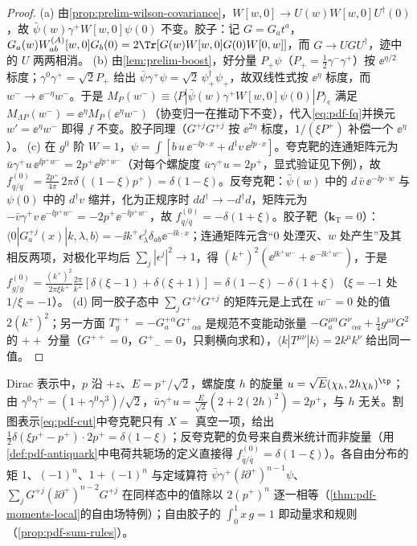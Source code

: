 \begin{proof}
(a) 由\cref{prop:prelim-wilson-covariance}，$W[w,0]\to U(w)W[w,0]U^\dagger(0)$，故 $\bar\psi(w)\gamma^+W[w,0]\psi(0)$ 不变。胶子：记 $G=G_at^a$，$G_a(w)W^{(A)}_{ab}[w,0]G_b(0)=2\Tr[G(w)W[w,0]G(0)W[0,w]]$，而 $G\to UGU^\dagger$，迹中的 $U$ 两两相消。
(b) 由\cref{lem:prelim-boost}，好分量 $P_+\psi$（$P_+=\frac12\gamma^-\gamma^+$）按 $\ee^{\eta/2}$ 标度；$\gamma^0\gamma^+=\sqrt2P_+$ 给出 $\bar\psi\gamma^+\psi=\sqrt2\,\psi_+^\dagger\psi_+$，故双线性式按 $\ee^{\eta}$ 标度，而 $w^-\to\ee^{-\eta}w^-$。于是 $M_P(w^-)\equiv\langle P|\bar\psi(w)\gamma^+W[w,0]\psi(0)|P\rangle_{\mathrm c}$ 满足 $M_{\Lambda P}(w^-)=\ee^{\eta}M_P(\ee^{\eta}w^-)$（协变归一在推动下不变），代入\cref{eq:pdf-fq}并换元 $w'=\ee^\eta w^-$ 即得 $f$ 不变。胶子同理（$G^{+j}G^{+j}$ 按 $\ee^{2\eta}$ 标度，$1/(\xi P^+)$ 补偿一个 $\ee^{\eta}$）。
(c) 在 $g^0$ 阶 $W=1$，$\psi=\int[b\,u\,\ee^{-\ii p\cdot x}+d^\dagger v\,\ee^{\ii p\cdot x}]$。夸克靶的连通矩阵元为 $\bar u\gamma^+u\,\ee^{\ii p^+w^-}=2p^+\ee^{\ii p^+w^-}$（对每个螺旋度 $\bar u\gamma^+u=2p^+$，显式验证见下例），故 $f^{(0)}_{q/q}=\frac{2p^+}{4\pi}\,2\pi\delta((1-\xi)p^+)=\delta(1-\xi)$。反夸克靶：$\bar\psi(w)$ 中的 $d\,\bar v\,\ee^{-\ii p\cdot w}$ 与 $\psi(0)$ 中的 $d^\dagger v$ 缩并，化为正规序时 $dd^\dagger\to-d^\dagger d$，矩阵元为 $-\bar v\gamma^+v\,\ee^{-\ii p^+w^-}=-2p^+\ee^{-\ii p^+w^-}$，故 $f^{(0)}_{q/\bar q}=-\delta(1+\xi)$。胶子靶（$\bm k_{\mathrm T}=0$）：$\langle0|G^{+j}_a(x)|k,\lambda,b\rangle=-\ii k^+\epsilon^j_\lambda\delta_{ab}\ee^{-\ii k\cdot x}$；连通矩阵元含“$0$ 处湮灭、$w$ 处产生”及其相反两项，对极化平均后 $\sum_j|\epsilon^j|^2\to1$，得 $(k^+)^2(\ee^{\ii k^+w^-}+\ee^{-\ii k^+w^-})$，于是 $f^{(0)}_{g/g}=\frac{(k^+)^2}{2\pi\xi k^+}\frac{2\pi}{k^+}[\delta(\xi-1)+\delta(\xi+1)]=\delta(1-\xi)-\delta(1+\xi)$（$\xi=-1$ 处 $1/\xi=-1$）。
(d) 同一胶子态中 $\sum_jG^{+j}G^{+j}$ 的矩阵元是上式在 $w^-=0$ 处的值 $2(k^+)^2$；另一方面 $T^{++}_g=-G^{+\alpha}_aG^{+}{}_{\alpha a}$ 是规范不变能动张量 $-G^{\mu\alpha}_aG^\nu{}_{\alpha a}+\frac14g^{\mu\nu}G^2$ 的 $++$ 分量（$G^{++}=0$，$G^+{}_-=0$，只剩横向求和），$\langle k|T^{\mu\nu}|k\rangle=2k^\mu k^\nu$ 给出同一值。
\end{proof}

\begin{example}[自由场值]\label{ex:pdf-free-field}
Dirac 表示中，$p$ 沿 $+z$、$E=p^+/\sqrt2$，螺旋度 $h$ 的旋量 $u=\sqrt E(\chi_h,2h\chi_h)^{\tp}$；由 $\gamma^0\gamma^+=(1+\gamma^0\gamma^3)/\sqrt2$，$\bar u\gamma^+u=\frac{E}{\sqrt2}(2+2(2h)^2)=2p^+$，与 $h$ 无关。割图表示\cref{eq:pdf-cut}中夸克靶只有 $X=$ 真空一项，给出 $\frac12\delta(\xi p^+-p^+)\cdot2p^+=\delta(1-\xi)$；反夸克靶的负号来自费米统计而非旋量（用\cref{def:pdf-antiquark}中电荷共轭场的定义直接得 $f^{(0)}_{\bar q/\bar q}=\delta(1-\xi)$）。各自由分布的矩 $1$、$(-1)^n$、$1+(-1)^n$ 与定域算符 $\bar\psi\gamma^+(\ii\partial^+)^{n-1}\psi$、$\sum_jG^{+j}(\ii\partial^+)^{n-2}G^{+j}$ 在同样态中的值除以 $2(p^+)^n$ 逐一相等（\cref{thm:pdf-moments-local}的自由场特例）；自由胶子的 $\int_0^1x\,g=1$ 即动量求和规则（\cref{prop:pdf-sum-rules}）。
\end{example}

